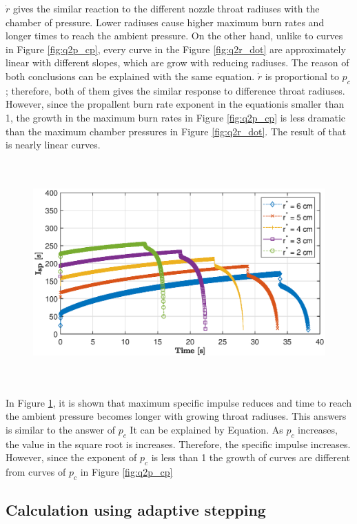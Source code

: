 \documentclass[letterpaper,12pt]{article}
\begin{document}
$\dot r$ gives the similar reaction to the different nozzle throat radiuses with the chamber of pressure. Lower radiuses cause higher 
maximum burn rates and longer times to reach the ambient pressure. On the other hand, unlike to curves in Figure \ref{fig:q2p_cp}, every 
curve in the Figure \ref{fig:q2r_dot} are approximately linear with different slopes, which are grow with reducing radiuses. The reason 
of both conclusions can be explained with the same equation. $\dot{r}$ is proportional to $p_c$; therefore, both of them gives 
the similar response to difference throat radiuses. However, since the propallent burn rate exponent in the equationis smaller than 1, 
the growth in the maximum burn rates in Figure \ref{fig:q2p_cp} is less dramatic than the maximum chamber pressures in Figure 
\ref{fig:q2r_dot}. The result of that is nearly linear curves.

\begin{figure}[!h]
	\centering
	\includegraphics[height = 8.5cm]{graphs/q2_isp.eps}
	\label{fig:q2I_sp}
\end{figure}
In Figure \ref{fig:q2I_sp}, it is shown that maximum specific impulse reduces and time to reach the ambient pressure becomes longer with
growing throat radiuses. This answers is similar to the answer of $p_c$ It can be explained by Equation. As $p_c$ increases, the value in
the square root is increases. Therefore, the specific impulse increases. However, since the exponent of $p_c$ is less than 1 the growth of 
curves are different from curves of $p_c$ in Figure \ref{fig:q2p_cp}

\subsection{Calculation using adaptive stepping}
\end{document}
